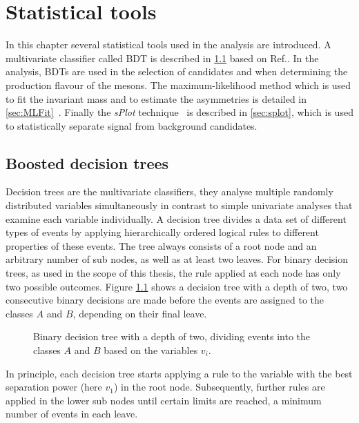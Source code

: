 \chapter{Statistical tools}
\label{chap:tools}

\linespread{1.08}\selectfont
In this chapter several statistical tools used in the analysis are introduced.
A multivariate classifier called \ac{BDT} is described in \cref{sec:BDT} based on Ref.\cite{Bohm:389738}.
In the analysis, \ac{BDT}s are used in the selection of \BdToDpi candidates and when determining the production flavour of the \Bz mesons.
The maximum-likelihood method which is used to fit the invariant \Bz mass and to estimate the \CP asymmetries is detailed in \cref{sec:MLFit}~\cite{Bohm:389738}.
Finally the \emph{sPlot} technique~\cite{Pivk:2004ty} is described in \cref{sec:splot}, which is used to statistically separate signal from background candidates.

\section{Boosted decision trees}
\label{sec:BDT}

Decision trees are the multivariate classifiers, \ie they analyse multiple randomly distributed variables simultaneously in contrast to simple univariate analyses that examine each variable individually.
A decision tree divides a data set of different types of events by applying hierarchically ordered logical rules to different properties of these events.
The tree always consists of a root node and an arbitrary number of sub nodes, as well as at least two leaves.
For binary decision trees, as used in the scope of this thesis, the rule applied at each node has only two possible outcomes.
Figure \ref{fig:BDTexample} shows a decision tree with a depth of two, \ie two consecutive binary decisions are made before the events are assigned to the classes $A$ and $B$, depending on their final leave.
\begin{figure}[tbp]
    \centering
    
    \caption{Binary decision tree with a depth of two, dividing events into the classes $A$ and $B$ based on the variables $v_i$.}
    \label{fig:BDTexample}
\end{figure}
In principle, each decision tree starts applying a rule to the variable with the best separation power (here $v_1$) in the root node.
Subsequently, further rules are applied in the lower sub nodes until certain limits are reached, \eg a minimum number of events in each leave.

